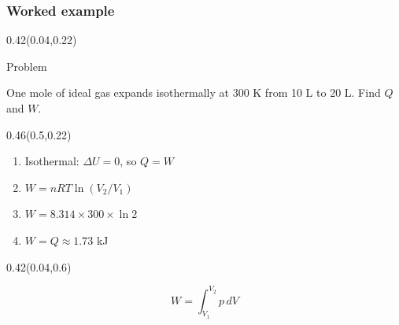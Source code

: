 \documentclass[aspectratio=169]{beamer}
\begin{document}
\begin{frame}[t]
  \frametitle{Worked example}

\begin{textblock}{0.42}(0.04,0.22)
{\begin{block}{Problem}\raggedright\fontsize{14}{17}\selectfont One mole of ideal gas expands isothermally at 300 K from 10 L to 20 L. Find $Q$ and $W$.\end{block}\par}
\end{textblock}

\begin{textblock}{0.46}(0.5,0.22)
{\raggedright\fontsize{15}{18}\selectfont \begin{enumerate}
\item Isothermal: $\Delta U = 0$, so $Q = W$
\item $W = nRT\ln(V_2/V_1)$
\item $W = 8.314 \times 300 \times \ln 2$
\item $W = Q \approx 1.73$ kJ
\end{enumerate}\par}
\end{textblock}

\begin{textblock}{0.42}(0.04,0.6)
{\centering\fontsize{20}{24}\selectfont \[W=\int_{V_1}^{V_2} p\,dV\]\par}
\end{textblock}
\end{frame}
\end{document}
